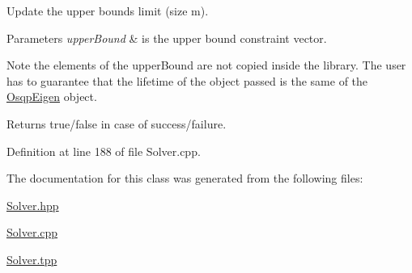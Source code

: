 Update the upper bounds limit (size m). 


\begin{DoxyParams}{Parameters}
{\em upper\+Bound} & is the upper bound constraint vector. \\
\hline
\end{DoxyParams}
\begin{DoxyNote}{Note}
the elements of the upper\+Bound are not copied inside the library. The user has to guarantee that the lifetime of the object passed is the same of the \mbox{\hyperlink{namespaceOsqpEigen}{Osqp\+Eigen}} object. 
\end{DoxyNote}
\begin{DoxyReturn}{Returns}
true/false in case of success/failure. 
\end{DoxyReturn}


Definition at line 188 of file Solver.\+cpp.



The documentation for this class was generated from the following files\+:\begin{DoxyCompactItemize}
\item 
\mbox{\hyperlink{Solver_8hpp}{Solver.\+hpp}}\item 
\mbox{\hyperlink{Solver_8cpp}{Solver.\+cpp}}\item 
\mbox{\hyperlink{Solver_8tpp}{Solver.\+tpp}}\end{DoxyCompactItemize}
